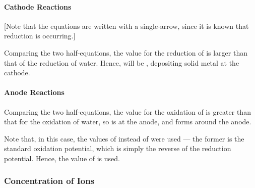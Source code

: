 				\paragraph{Cathode Reactions}

				[Note that the equations are written with a single-arrow, since it is known that reduction is occurring.]

				Comparing the two half-equations, the \Eo{} value for the reduction of  is larger than that of the reduction of water.
				Hence,  will be , depositing solid  metal at the cathode.



				\paragraph{Anode Reactions}


				Comparing the two half-equations, the \Eox{} value for the oxidation of  is greater than that for
				the oxidation of water, so  is  at the anode, and  forms around the anode.

				Note that, in this case, the values of \Eox{} instead of \Eo{} were used --- the former is the standard oxidation
				potential, which is simply the reverse of the reduction potential. Hence, the  value of \Eox{} is used.



			\subsubsection{Concentration of Ions}

